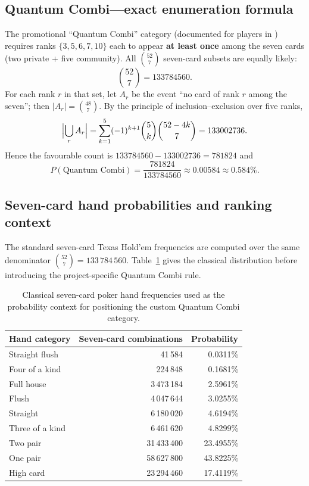 \documentclass[11pt,a4paper]{article}
\begin{document}
\subsection{Quantum Combi---exact enumeration formula}

The promotional ``Quantum Combi'' category (documented for players in ) requires ranks $\{3,5,6,7,10\}$ each to appear \textbf{at least once} among the seven cards (two private + five community). All $\binom{52}{7}$ seven-card subsets are equally likely:
\[
\binom{52}{7} = 133784560 .
\]
For each rank $r$ in that set, let $A_r$ be the event ``no card of rank $r$ among the seven''; then $|A_r|=\binom{48}{7}$. By the principle of inclusion--exclusion over five ranks,
\[
\Bigl|\bigcup_{r} A_r\Bigr|
  = \sum_{k=1}^{5} (-1)^{k+1}\binom{5}{k}\binom{52-4k}{7}
  = 133002736 .
\]
Hence the favourable count is $133784560-133002736 = 781824$ and
\[
P(\text{Quantum Combi}) = \frac{781824}{133784560} \approx 0.00584 \approx 0.584\%.
\]

\subsection{Seven-card hand probabilities and ranking context}

The standard seven-card Texas Hold'em frequencies are computed over the same denominator $\binom{52}{7}=133\,784\,560$. Table~\ref{tab:seven-card-probabilities} gives the classical distribution before introducing the project-specific Quantum Combi rule.

\begin{table}[htbp]
\centering
\small
\begin{tabular}{@{}lrr@{}}
\toprule
Hand category & Seven-card combinations & Probability \\
\midrule
Straight flush & 41\,584 & 0.0311\% \\
Four of a kind & 224\,848 & 0.1681\% \\
Full house & 3\,473\,184 & 2.5961\% \\
Flush & 4\,047\,644 & 3.0255\% \\
Straight & 6\,180\,020 & 4.6194\% \\
Three of a kind & 6\,461\,620 & 4.8299\% \\
Two pair & 31\,433\,400 & 23.4955\% \\
One pair & 58\,627\,800 & 43.8225\% \\
High card & 23\,294\,460 & 17.4119\% \\
\bottomrule
\end{tabular}
\caption{Classical seven-card poker hand frequencies used as the probability context for positioning the custom Quantum Combi category.}\label{tab:seven-card-probabilities}
\end{table}
\end{document}
